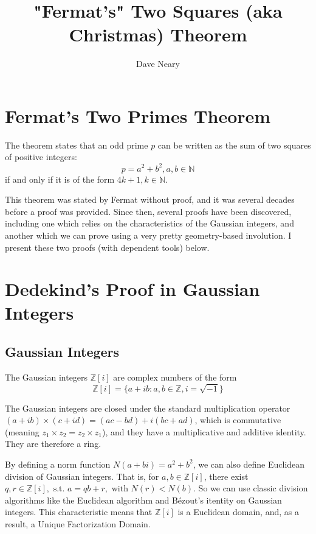 \documentclass{article}
\begin{document}
\title{"Fermat's" Two Squares (aka Christmas) Theorem}
\author{Dave Neary}

\maketitle

\section{Fermat's Two Primes Theorem}

The theorem states that an odd prime $p$ can be written as the sum of two squares of
positive integers:
\[ p = a^2 + b^2 , a, b \in \mathbb{N} \]
if and only if it is of the form $4k+1, k\in \mathbb{N}$.

This theorem was stated by Fermat without proof, and it was several decades before a proof
was provided. Since then, several proofs have been discovered, including one which relies 
on the characteristics of the Gaussian integers, and another which we can prove using a
very pretty geometry-based involution. I present these two proofs (with dependent tools)
below.

\section{Dedekind's Proof in Gaussian Integers}

\subsection{Gaussian Integers}

The Gaussian integers $\mathbb{Z}[i]$ are complex numbers of the form 
\[ \mathbb{Z}[i] = \{a+ib:a,b\in \mathbb{Z}, i=\sqrt{-1}\}\]

The Gaussian integers are closed under the standard multiplication operator
$(a+ib) \times (c+id) = (ac-bd) + i(bc+ad)$, which is commutative (meaning
$z_1 \times z_2 = z_2 \times z_1$), and they have a multiplicative and additive
identity. They are therefore a ring.

By defining a norm function $N(a+bi) = a^2+b^2$, we can also define Euclidean division of
Gaussian integers. That is, for $a,b \in \mathbb{Z}[i]$, there exist $q,r \in \mathbb{Z}[i],
\text{ s.t. } a=qb+r, \text{ with } N(r)<N(b)$. So we can use classic division
algorithms like  the Euclidean algorithm and Bézout's itentity on Gaussian integers. This
characteristic means that $\mathbb{Z}[i]$ is a Euclidean domain, and, as a result, a Unique
Factorization Domain.
\end{document}
